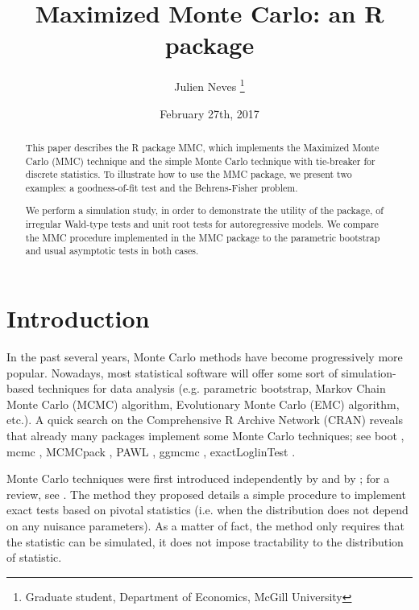 \documentclass[]{article}\usepackage[]{graphicx}\usepackage[]{color}
\newcommand{\pkg}[1]{{\normalfont\fontseries{b}\selectfont #1}}
\let\proglang=\textsf
\begin{document}
\title{Maximized Monte Carlo: an \proglang{R} package}
\author{Julien Neves \thanks{Graduate student, Department of Economics, McGill University}}
\date{February 27th, 2017}

\maketitle

\begin{abstract}
	This paper describes the \proglang{R} package \pkg{MMC}, which implements the Maximized Monte Carlo (MMC) technique and the simple Monte Carlo technique with tie-breaker for discrete statistics. To illustrate how to use the \pkg{MMC} package, we present two examples: a goodness-of-fit test and the Behrens-Fisher problem.

	We perform a simulation study, in order to demonstrate the utility of the package, of irregular Wald-type tests and unit root tests for autoregressive models. We compare the MMC procedure implemented in the \pkg{MMC} package to the parametric bootstrap and usual asymptotic tests in both cases.
\end{abstract}

\clearpage

\tableofcontents

\clearpage

\section{Introduction}
\label{intro}

In the past several years, Monte Carlo methods have become progressively more popular. Nowadays, most statistical software will offer some sort of simulation-based techniques for data analysis (e.g. parametric bootstrap, Markov Chain Monte Carlo (MCMC) algorithm, Evolutionary Monte Carlo (EMC) algorithm, etc.). A quick search on the Comprehensive \proglang{R} Archive Network (CRAN) reveals that already many packages implement some Monte Carlo techniques; see \pkg{boot} \citep{canty_boot:_2016}, \pkg{mcmc} \citep{geyer_mcmc:_2015}, \pkg{MCMCpack} \citep{martin_mcmcpack:_2011}, \pkg{PAWL} \citep{bornn_pawl:_2012}, \pkg{ggmcmc} \citep{fernandez-i-marin_ggmcmc:_2016}, \pkg{exactLoglinTest} \citep{caffo_exactloglintest:_2013}.

Monte Carlo techniques were first introduced independently by \cite{dwass_modified_1957} and by \cite{barnard_comment_1963}; for a review, see \cite{dufour_monte_2003}. The method they proposed details a simple procedure to implement exact tests based on pivotal statistics (i.e. when the distribution does not depend on any nuisance parameters). As a matter of fact, the method only requires that the statistic can be simulated, it does not impose tractability to the distribution of statistic.
\end{document}
